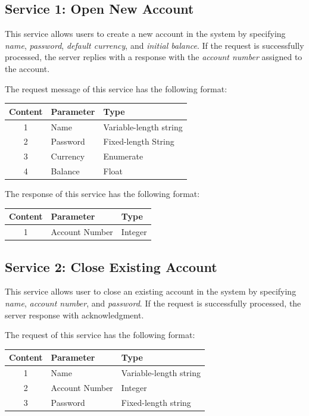 \documentclass[12pt]{article}
\begin{document}
\subsection{Service 1: Open New Account}
This service allows users to create a new account in the system by specifying \textit{name}, \textit{password}, \textit{default currency}, and \textit{initial balance}. If the request is successfully processed, the server replies with a response with the \textit{account number} assigned to the account.

The request message of this service has the following format:

\noindent\begin{minipage}{\linewidth}
	\centering
	\begin{tabular}{c l l}
  	\hline
    \textbf{Content} & \textbf{Parameter} & \textbf{Type}\\
    \hline
    1 & Name & Variable-length string \\
    2 & Password & Fixed-length String \\
    3 & Currency & Enumerate \\
    4 & Balance & Float \\
    \hline
	\end{tabular}
\end{minipage}

The response of this service has the following format:

\noindent\begin{minipage}{\linewidth}
	\centering
	\begin{tabular}{c l l}
  	\hline
    \textbf{Content} & \textbf{Parameter} & \textbf{Type}\\
    \hline
    1 & Account Number & Integer \\
    \hline
	\end{tabular}
\end{minipage}


\subsection{Service 2: Close Existing Account}
This service allows user to close an existing account in the system by specifying \textit{name}, \textit{account number}, and \textit{password}. If the request is successfully processed, the server response with acknowledgment.

The request of this service has the following format:

\noindent\begin{minipage}{\linewidth}
	\centering
	\begin{tabular}{c l l}
  	\hline
    \textbf{Content} & \textbf{Parameter} & \textbf{Type}\\
    \hline
    1 & Name & Variable-length string \\
    2 & Account Number & Integer \\
    3 & Password & Fixed-length string \\
    \hline
	\end{tabular}
\end{minipage}
\end{document}

